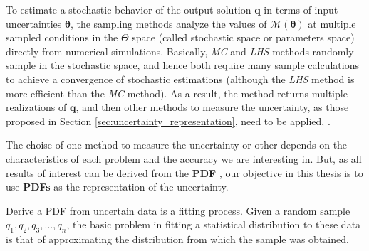To estimate a stochastic behavior of the output solution $\bm{q}$  in terms of input uncertainties $\bm{\theta}$, the sampling methods analyze the values of $\mathcal{M}(\bm{\theta})$ at multiple sampled conditions in the $\Theta$ space (called stochastic space or parameters space) directly from numerical simulations. Basically, \textit{MC} and \textit{LHS} methods randomly sample in the stochastic space, and hence both require many sample calculations to achieve a convergence of stochastic estimations (although the \textit{LHS} method is more efficient than the \textit{MC} method). As a result, the method returns multiple realizations of $\bm{q}$, and then other methods to measure the uncertainty, as those proposed in Section \ref{sec:uncertainty_representation}, need to be applied,  \cite{Baxter2016, Estacio-Hiroms2012, Farrell2015}. 

The choise of one method to measure the uncertainty or other depends on the characteristics of each problem and the accuracy we are interesting in. But, as all results of interest can be derived from the \textbf{PDF} \cite{Cox2012}, our objective in this thesis is to use \textbf{PDFs} as the representation of the uncertainty. 
 

%

Derive a PDF from uncertain data is a fitting process. Given a random sample $q_{1}, q_{2}, q_{3},...,q_{n}$, the basic problem in fitting a statistical distribution to these data is that of approximating the distribution from which the sample was obtained. 


